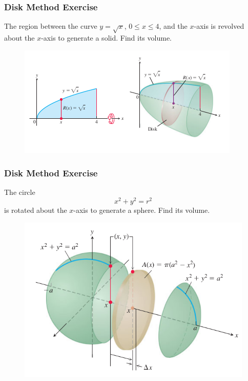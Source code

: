 \documentclass[xcolor=dvipsnames]{beamer}
\begin{document}
\begin{frame}
  \frametitle{Disk Method Exercise}
{\ubung} The region between the curve $y=\sqrt{x}$, $0\leq{}x\leq{}4$,
and the $x$-axis is revolved about the $x$-axis to generate a solid.
Find its volume.
  \begin{figure}[h]
    \includegraphics[scale=0.65]{./diagrams/disk_ed.png}
  \end{figure}
\end{frame}

\begin{frame}
  \frametitle{Disk Method Exercise}
{\ubung} The circle
\begin{equation}
  \label{eq:ohtooquu}
  x^{2}+y^{2}=r^{2}
\end{equation}
is rotated about the $x$-axis to generate a sphere. Find its volume.
\begin{figure}[h]
  \includegraphics[scale=0.4]{./diagrams/spherevol.png}
\end{figure}
\end{frame}
\end{document}
